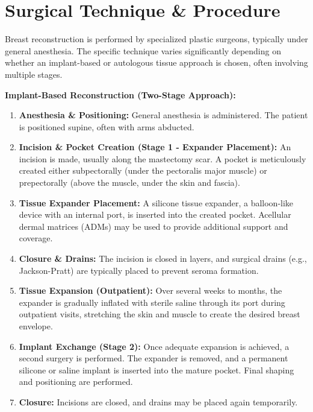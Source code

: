 \section*{Surgical Technique \& Procedure}
Breast reconstruction is performed by specialized plastic surgeons, typically under general anesthesia. The specific technique varies significantly depending on whether an implant-based or autologous tissue approach is chosen, often involving multiple stages.

\textbf{Implant-Based Reconstruction (Two-Stage Approach):}
\begin{enumerate}
  \item \textbf{Anesthesia \& Positioning:} General anesthesia is administered. The patient is positioned supine, often with arms abducted.
  \item \textbf{Incision \& Pocket Creation (Stage 1 - Expander Placement):} An incision is made, usually along the mastectomy scar. A pocket is meticulously created either subpectorally (under the pectoralis major muscle) or prepectorally (above the muscle, under the skin and fascia).
  \item \textbf{Tissue Expander Placement:} A silicone tissue expander, a balloon-like device with an internal port, is inserted into the created pocket. Acellular dermal matrices (ADMs) may be used to provide additional support and coverage.
  \item \textbf{Closure \& Drains:} The incision is closed in layers, and surgical drains (e.g., Jackson-Pratt) are typically placed to prevent seroma formation.
  \item \textbf{Tissue Expansion (Outpatient):} Over several weeks to months, the expander is gradually inflated with sterile saline through its port during outpatient visits, stretching the skin and muscle to create the desired breast envelope.
  \item \textbf{Implant Exchange (Stage 2):} Once adequate expansion is achieved, a second surgery is performed. The expander is removed, and a permanent silicone or saline implant is inserted into the mature pocket. Final shaping and positioning are performed.
  \item \textbf{Closure:} Incisions are closed, and drains may be placed again temporarily.
\end{enumerate}

